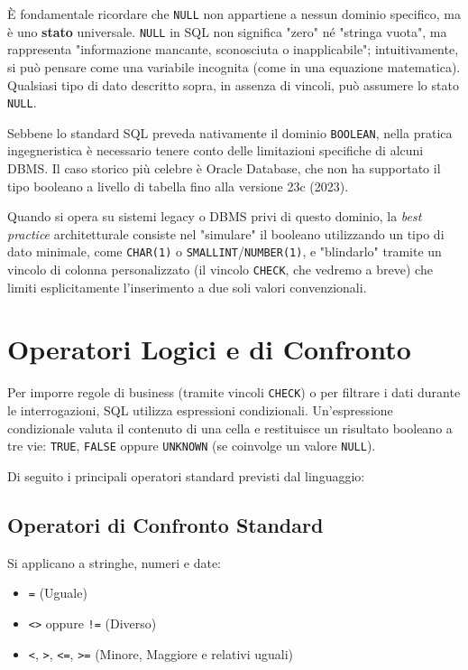 \begin{warningbox}
È fondamentale ricordare che \texttt{NULL} non appartiene a nessun dominio specifico, ma è uno \textbf{stato} universale. \texttt{NULL} in SQL non significa "zero" né "stringa vuota", ma rappresenta "informazione mancante, sconosciuta o inapplicabile"; intuitivamente, si può pensare come una variabile incognita (come in una equazione matematica). Qualsiasi tipo di dato descritto sopra, in assenza di vincoli, può assumere lo stato \texttt{NULL}.
\end{warningbox}

\begin{dettagli}
Sebbene lo standard SQL preveda nativamente il dominio \texttt{BOOLEAN}, nella pratica ingegneristica è necessario tenere conto delle limitazioni specifiche di alcuni DBMS. Il caso storico più celebre è Oracle Database, che non ha supportato il tipo booleano a livello di tabella fino alla versione 23c (2023).

Quando si opera su sistemi legacy o DBMS privi di questo dominio, la \textit{best practice} architetturale consiste nel "simulare" il booleano utilizzando un tipo di dato minimale, come \texttt{CHAR(1)} o \texttt{SMALLINT}/\texttt{NUMBER(1)}, e "blindarlo" tramite un vincolo di colonna personalizzato (il vincolo \texttt{CHECK}, che vedremo a breve) che limiti esplicitamente l'inserimento a due soli valori convenzionali.
\end{dettagli}

\section{Operatori Logici e di Confronto}

Per imporre regole di business (tramite vincoli \texttt{CHECK}) o per filtrare i dati durante le interrogazioni, SQL utilizza espressioni condizionali. Un'espressione condizionale valuta il contenuto di una cella e restituisce un risultato booleano a tre vie: \texttt{TRUE}, \texttt{FALSE} oppure \texttt{UNKNOWN} (se coinvolge un valore \texttt{NULL}).

Di seguito i principali operatori standard previsti dal linguaggio:

\subsection*{Operatori di Confronto Standard}
Si applicano a stringhe, numeri e date:
\begin{itemize}
    \item \texttt{=} (Uguale)
    \item \texttt{<>} oppure \texttt{!=} (Diverso)
    \item \texttt{<}, \texttt{>}, \texttt{<=}, \texttt{>=} (Minore, Maggiore e relativi uguali)
\end{itemize}


